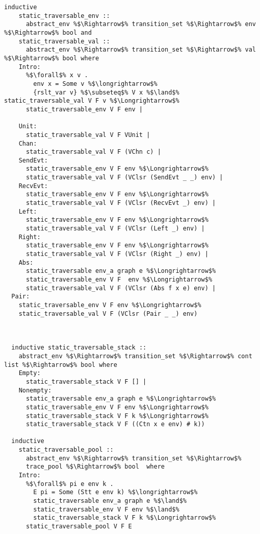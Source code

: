 \begin{lstlisting}[style=codestyle1, escapechar=\%]
  inductive 
    static_traversable_env ::
      abstract_env %$\Rightarrow$% transition_set %$\Rightarrow$% env %$\Rightarrow$% bool and
    static_traversable_val ::
      abstract_env %$\Rightarrow$% transition_set %$\Rightarrow$% val %$\Rightarrow$% bool where
    Intro:
      %$\forall$% x v .
        env x = Some v %$\longrightarrow$%
        {rslt_var v} %$\subseteq$% V x %$\land$% static_traversable_val V F v %$\Longrightarrow$%
      static_traversable_env V F env |

    Unit:
      static_traversable_val V F VUnit |
    Chan:
      static_traversable_val V F (VChn c) |
    SendEvt:
      static_traversable_env V F env %$\Longrightarrow$%
      static_traversable_val V F (VClsr (SendEvt _ _) env) |
    RecvEvt:
      static_traversable_env V F env %$\Longrightarrow$%
      static_traversable_val V F (VClsr (RecvEvt _) env) |
    Left:
      static_traversable_env V F env %$\Longrightarrow$%
      static_traversable_val V F (VClsr (Left _) env) |
    Right:
      static_traversable_env V F env %$\Longrightarrow$%
      static_traversable_val V F (VClsr (Right _) env) |
    Abs:
      static_traversable env_a graph e %$\Longrightarrow$% 
      static_traversable_env V F  env %$\Longrightarrow$%
      static_traversable_val V F (VClsr (Abs f x e) env) |
  Pair:
    static_traversable_env V F env %$\Longrightarrow$%
    static_traversable_val V F (VClsr (Pair _ _) env) 



  inductive static_traversable_stack ::
    abstract_env %$\Rightarrow$% transition_set %$\Rightarrow$% cont list %$\Rightarrow$% bool where
    Empty:
      static_traversable_stack V F [] |
    Nonempty:
      static_traversable env_a graph e %$\Longrightarrow$%
      static_traversable_env V F env %$\Longrightarrow$%
      static_traversable_stack V F k %$\Longrightarrow$% 
      static_traversable_stack V F ((Ctn x e env) # k))

  inductive
    static_traversable_pool ::
      abstract_env %$\Rightarrow$% transition_set %$\Rightarrow$%
      trace_pool %$\Rightarrow$% bool  where
    Intro:
      %$\forall$% pi e env k .
        E pi = Some (Stt e env k) %$\longrightarrow$% 
        static_traversable env_a graph e %$\land$%
        static_traversable_env V F env %$\land$%
        static_traversable_stack V F k %$\Longrightarrow$% 
      static_traversable_pool V F E

  \end{lstlisting}
